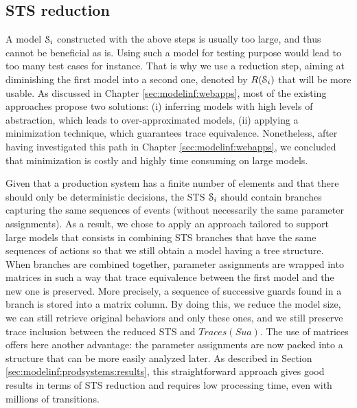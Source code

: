 \subsection{STS reduction}
\label{sec:modelinf:prodsystems:reduction}

A model $\EuScript{S}_i$ constructed with the above steps is
usually too large, and thus cannot be beneficial as is. Using
such a model for testing purpose would lead to too many test
cases for instance. That is why we use a reduction step, aiming
at diminishing the first model into a second one, denoted by
$R(\EuScript{S}_i)$ that will be more usable. As discussed in
Chapter \ref{sec:modelinf:webapps}, most of the existing
approaches propose two solutions: (i) inferring models with high
levels of abstraction, which leads to over-approximated models,
(ii) applying a minimization technique, which guarantees trace
equivalence.  Nonetheless, after having investigated this path in
Chapter \ref{sec:modelinf:webapps}, we concluded that
minimization is costly and highly time consuming on large models.

Given that a production system has a finite number of elements
and that there should only be deterministic decisions, the STS
$\EuScript{S}_i$ should contain branches capturing the same
sequences of events (without necessarily the same parameter
assignments).  As a result, we chose to apply an approach
tailored to support large models that
consists in combining STS branches that have the same
sequences of actions so that we still obtain a model having a
tree structure. When branches are combined together, parameter
assignments are wrapped into matrices in such a way that trace
equivalence between the first model and the new one is preserved.
More precisely, a sequence of successive guards found in a branch
is stored into a matrix column. By doing this, we reduce the
model size, we can still retrieve original behaviors and only
these ones, and we still preserve trace inclusion between the
reduced STS and $Traces(Sua)$.
The use of matrices offers here another advantage: the parameter
assignments are now packed into a structure that can be more
easily analyzed later. As described in Section
\ref{sec:modelinf:prodsystems:results}, this straightforward
approach gives good results in terms of STS reduction and
requires low processing time, even with millions of transitions.

